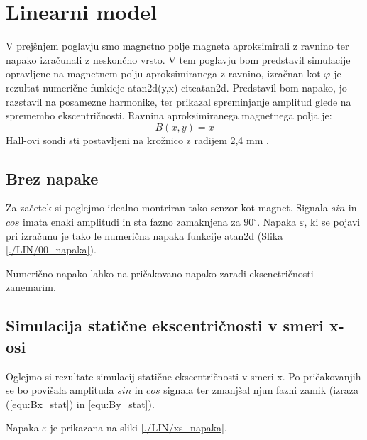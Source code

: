 \chapter{Linearni model}

V prejšnjem poglavju smo magnetno polje magneta aproksimirali z ravnino ter napako izračunali z neskončno vrsto. V tem poglavju bom predstavil simulacije opravljene na magnetnem polju aproksimiranega z ravnino, izračnan kot $\varphi$ je rezultat numerične funkicje atan2d(y,x) citeatan2d. Predstavil bom napako, jo razstavil na posamezne harmonike, ter prikazal spreminjanje amplitud glede na spremembo ekscentričnosti. Ravnina aproksimiranega magnetnega polja je: 
\begin{equation}
\label{equ:lin_polje}
B(x,y)= x
\end{equation}
Hall-ovi sondi sti postavljeni na krožnico z radijem 2,4 mm \cite{AM8192}.


\section{Brez napake}

Za začetek si poglejmo idealno montriran tako senzor kot magnet. Signala $sin$ in $cos$ imata enaki amplitudi in sta fazno zamaknjena za $90^{\circ}$. Napaka $\varepsilon$, ki se pojavi pri izračunu je tako le numerična napaka funkcije atan2d (Slika \ref{./LIN/00_napaka}).

Numerično napako lahko na pričakovano napako zaradi ekscnetričnosti zanemarim.


\newpage
\section{Simulacija statične ekscentričnosti v smeri x-osi}

Oglejmo si rezultate simulacij statične ekscentričnosti v smeri x. Po pričakovanjih se bo povišala amplituda $sin$ in $cos$ signala ter zmanjšal njun fazni zamik (izraza (\ref{equ:Bx_stat}) in \ref{equ:By_stat}).
 
\newpage


Napaka $\varepsilon$  je prikazana na sliki \ref{./LIN/xs_napaka}.

